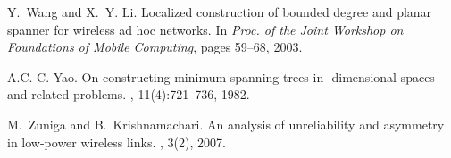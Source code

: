 \documentclass{llncs}
\begin{document}
\begin{thebibliography}{10}
Y.~Wang and X.~Y. Li.
\newblock Localized construction of bounded degree and planar spanner for
  wireless ad hoc networks.
\newblock In {\em Proc. of the Joint Workshop on Foundations of Mobile
  Computing}, pages 59--68, 2003.

A.C.-C. Yao.
\newblock On constructing minimum spanning trees in -dimensional spaces and
  related problems.
, 11(4):721--736, 1982.

M.~Zuniga and B.~Krishnamachari.
\newblock An analysis of unreliability and asymmetry in low-power wireless
  links.
, 3(2), 2007.

\end{thebibliography}
\end{document}
